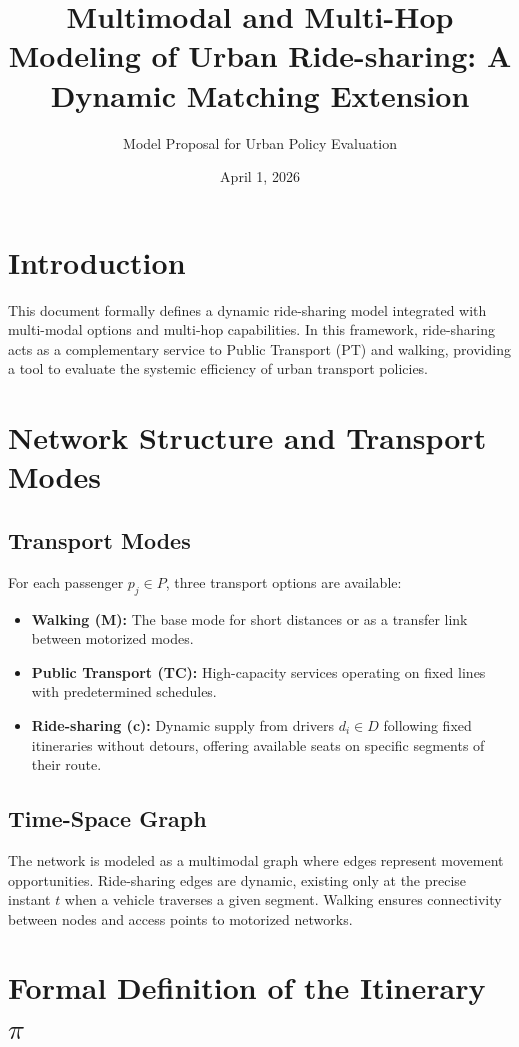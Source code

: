 \documentclass[12pt,a4paper]{article}
\title{Multimodal and Multi-Hop Modeling of Urban Ride-sharing: A Dynamic Matching Extension}
\author{Model Proposal for Urban Policy Evaluation}
\date{April 1, 2026}
\begin{document}
\maketitle

\section{Introduction}
This document formally defines a dynamic ride-sharing model integrated with multi-modal options and multi-hop capabilities. In this framework, ride-sharing acts as a complementary service to Public Transport (PT) and walking, providing a tool to evaluate the systemic efficiency of urban transport policies.

\section{Network Structure and Transport Modes}

\subsection{Transport Modes}
For each passenger $p_j \in P$, three transport options are available:
\begin{itemize}
    \item \textbf{Walking (M):} The base mode for short distances or as a transfer link between motorized modes.
    \item \textbf{Public Transport (TC):} High-capacity services operating on fixed lines with predetermined schedules.
    \item \textbf{Ride-sharing (c):} Dynamic supply from drivers $d_i \in D$ following fixed itineraries without detours, offering available seats on specific segments of their route.
\end{itemize}

\subsection{Time-Space Graph}
The network is modeled as a multimodal graph where edges represent movement opportunities. Ride-sharing edges are dynamic, existing only at the precise instant $t$ when a vehicle traverses a given segment. Walking ensures connectivity between nodes and access points to motorized networks.

\section{Formal Definition of the Itinerary $\pi$}
\end{document}
